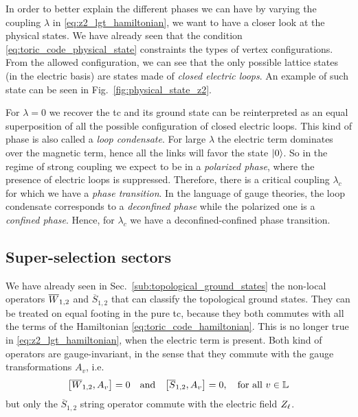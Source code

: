 In order to better explain the different phases we can have by varying the coupling $\lambda$ in \eqref{eq:z2_lgt_hamiltonian}, we want to have a closer look at the physical states.
We have already seen that the condition \eqref{eq:toric_code_physical_state} constraints the types of vertex configurations.
From the allowed configuration, we can see that the only possible lattice states (in the electric basis) are states made of \emph{closed electric loops}.
An example of such state can be seen in Fig.~\ref{fig:physical_state_z2}.


For $\lambda = 0$ we recover the \ac{tc} and its ground state can be reinterpreted as an equal superposition of all the possible configuration of closed electric loops.
This kind of phase is also called a \emph{loop condensate}.
For large $\lambda$ the electric term dominates over the magnetic term, hence all the links will favor the state $\ket{0}$.
So in the regime of strong coupling we expect to be in a \emph{polarized phase}, where the presence of electric loops is suppressed.
Therefore, there is a critical coupling $\lambda_c$ for which we have a \emph{phase transition}.
In the language of gauge theories, the loop condensate corresponds to a \emph{deconfined phase} while the polarized one is a \emph{confined phase}.
Hence, for $\lambda_c$ we have a deconfined-confined phase transition.

\begin{figure}[t]
\end{figure}



\subsection{Super-selection sectors}
\label{sub:super_selection_sectors}

We have already seen in Sec.~\ref{sub:topological_ground_states} the non-local operators $\overline{W}_{1,2}$ and $\overline{S}_{1,2}$ that can classify the topological ground states.
They can be treated on equal footing in the pure \ac{tc}, because they both commutes with all the terms of the Hamiltonian \eqref{eq:toric_code_hamiltonian}.
This is no longer true in \eqref{eq:z2_lgt_hamiltonian}, when the electric term is present.
Both kind of operators are gauge-invariant, in the sense that they commute with the gauge transformations $A_v$, i.e.
\begin{equation}
    \comm{\Wilson_{1,2}}{A_v} = 0
    \qand
    \comm{\overline{S}_{1,2}}{A_v} = 0,
    \quad \text{for all $v \in \lattice$}
\end{equation}
but only the $\overline{S}_{1,2}$ string operator commute with the electric field $Z_{\ell}$.

